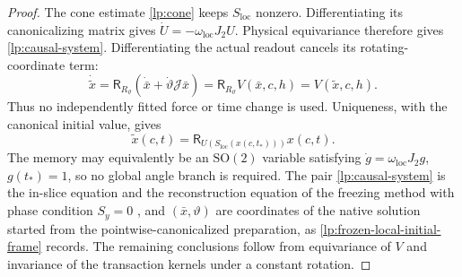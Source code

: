 \begin{proof}
The cone estimate \cref{lp:cone} keeps $S_{\mathrm{loc}}$ nonzero. Differentiating its canonicalizing matrix gives $\dot U=-\omega_{\mathrm{loc}}J_2U$. Physical equivariance therefore gives \cref{lp:causal-system}. Differentiating the actual readout cancels its rotating-coordinate term:
\begin{equation}
 \dot{\widetilde x}
 =\mathsf R_{R_\vartheta}(\dot{\bar x}+\dot\vartheta\mathcal J\bar x)
 =\mathsf R_{R_\vartheta}V(\bar x,c,h)
 =V(\widetilde x,c,h).
 \label{lp:causal-cancellation}
\end{equation}
Thus no independently fitted force or time change is used. Uniqueness, with the canonical initial value, gives
\begin{equation}
 \widetilde x(c,t)=\mathsf R_{U(S_{\mathrm{loc}}(x(c,t_*)))}x(c,t).
 \label{lp:frozen-local-initial-frame}
\end{equation}
The memory may equivalently be an $\mathrm{SO}(2)$ variable satisfying $\dot g=\omega_{\mathrm{loc}}J_2g$, $g(t_*)=1$, so no global angle branch is required. The pair \cref{lp:causal-system} is the in-slice equation and the reconstruction equation of the freezing method with phase condition $S_y=0$ \citep{BeynThummler2004,RowleyMarsden2000}, and $(\bar x,\vartheta)$ are coordinates of the native solution started from the pointwise-canonicalized preparation, as \cref{lp:frozen-local-initial-frame} records. The remaining conclusions follow from equivariance of $V$ and invariance of the transaction kernels under a constant rotation.


\end{proof}
